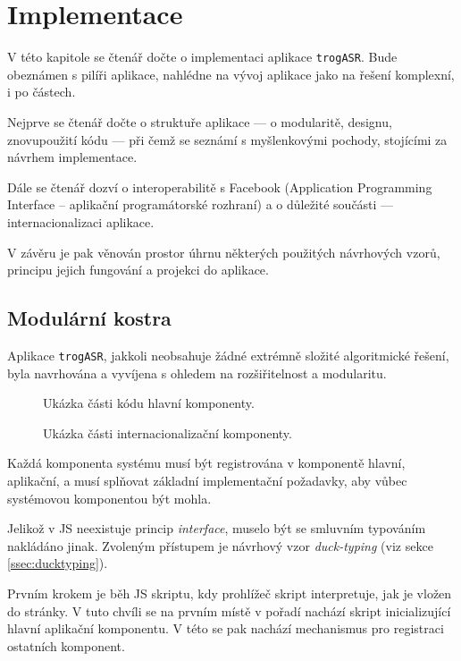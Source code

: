 \chapter{Implementace}

V této kapitole se čtenář dočte o implementaci aplikace \verb|trogASR|. Bude obeznámen s pilíři aplikace, nahlédne na vývoj aplikace jako na řešení komplexní, i po částech.

Nejprve se čtenář dočte o struktuře aplikace --- o modularitě, designu, znovupoužití kódu --- při čemž se seznámí s myšlenkovými pochody, stojícími za návrhem implementace.

Dále se čtenář dozví o interoperabilitě s Facebook  (Application Programming Interface -- aplikační programátorské rozhraní) a o důležité součásti --- internacionalizaci aplikace.

V závěru je pak věnován prostor úhrnu některých použitých návrhových vzorů, principu jejich fungování a projekci do aplikace.

\section{Modulární kostra}

Aplikace \verb|trogASR|, jakkoli neobsahuje žádné extrémně složité algoritmické řešení, byla navrhována a vyvíjena s ohledem na rozšiřitelnost a modularitu. 
\\
\begin{figure}[h]
	
	\caption{Ukázka části kódu hlavní komponenty.}
	\label{fig:app}
\end{figure}

\begin{figure}[h]
	
	\caption{Ukázka části internacionalizační komponenty.}
	\label{fig:comp}
\end{figure}

Každá komponenta systému musí být registrována v komponentě hlavní, aplikační, a musí splňovat základní implementační požadavky, aby vůbec systémovou komponentou být mohla.

Jelikož v JS neexistuje princip {\sl interface}, muselo být se smluvním typováním nakládáno jinak. Zvoleným přístupem je návrhový vzor {\sl duck-typing} (viz sekce \ref{ssec:ducktyping}).

Prvním krokem je běh JS skriptu, kdy prohlížeč skript interpretuje, jak je vložen do stránky. V tuto chvíli se na prvním místě v pořadí nachází skript inicializující hlavní aplikační komponentu. V této se pak nachází mechanismus pro registraci ostatních komponent.

